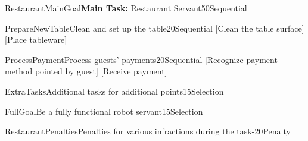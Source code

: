 \begin{Group}{RestaurantMainGoal}{\textbf{\textcolor{myturquoise}{Main Task:}} Restaurant Servant}{50}{Sequential}
\end{Group}


\begin{Group}{PrepareNewTable}{Clean and set up the table}{20}{Sequential}
    [Clean the table surface]
    [Place tableware]
\end{Group}

\begin{Group}{ProcessPayment}{Process guests' payments}{20}{Sequential}
    [Recognize payment method pointed by guest]
    [Receive payment]
\end{Group}

\begin{Group}{ExtraTasks}{Additional tasks for additional points}{15}{Selection}
\end{Group}


\begin{Group}{FullGoal}{Be a fully functional robot servant}{15}{Selection}
\end{Group}


\begin{Group}{RestaurantPenalties}{Penalties for various infractions during the task}{-20}{Penalty}
\end{Group}

